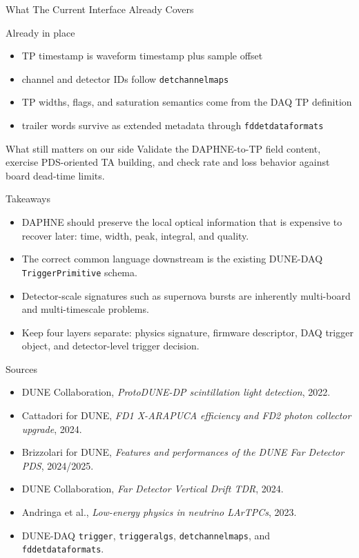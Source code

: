 \documentclass[aspectratio=169]{beamer}
\begin{document}
\begin{frame}{What The Current Interface Already Covers}
\small
\begin{block}{Already in place}
\begin{itemize}
  \item TP timestamp is waveform timestamp plus sample offset
  \item channel and detector IDs follow \texttt{detchannelmaps}
  \item TP widths, flags, and saturation semantics come from the DAQ TP definition
  \item trailer words survive as extended metadata through \texttt{fddetdataformats}
\end{itemize}
\end{block}

\begin{alertblock}{What still matters on our side}
Validate the DAPHNE-to-TP field content, exercise PDS-oriented TA building, and check rate and loss behavior against board dead-time limits.
\end{alertblock}
\end{frame}

\begin{frame}{Takeaways}
\small
\begin{itemize}
  \item DAPHNE should preserve the \alert{local optical information} that is expensive to recover later: time, width, peak, integral, and quality.
  \item The correct common language downstream is the existing DUNE-DAQ \texttt{TriggerPrimitive} schema.
  \item Detector-scale signatures such as supernova bursts are inherently \alert{multi-board and multi-timescale} problems.
  \item Keep four layers separate: physics signature, firmware descriptor, DAQ trigger object, and detector-level trigger decision.
\end{itemize}
\end{frame}

\begin{frame}{Sources}
\scriptsize
\begin{itemize}
  \item DUNE Collaboration, \emph{ProtoDUNE-DP scintillation light detection}, 2022.
  \item Cattadori for DUNE, \emph{FD1 X-ARAPUCA efficiency and FD2 photon collector upgrade}, 2024.
  \item Brizzolari for DUNE, \emph{Features and performances of the DUNE Far Detector PDS}, 2024/2025.
  \item DUNE Collaboration, \emph{Far Detector Vertical Drift TDR}, 2024.
  \item Andringa et al., \emph{Low-energy physics in neutrino LArTPCs}, 2023.
  \item DUNE-DAQ \texttt{trigger}, \texttt{triggeralgs}, \texttt{detchannelmaps}, and \texttt{fddetdataformats}.
\end{itemize}
\end{frame}
\end{document}
